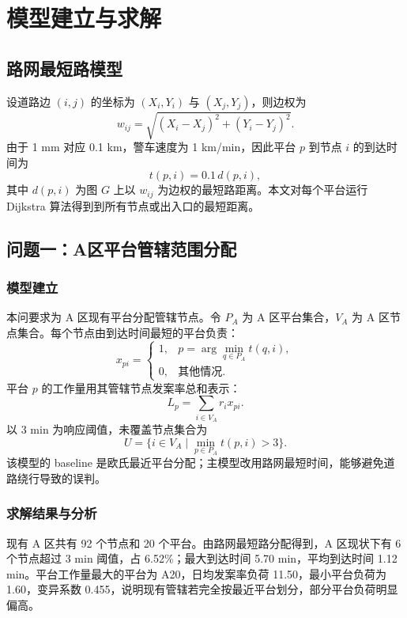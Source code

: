 \documentclass[UTF8,a4paper,12pt]{ctexart}
\begin{document}
\section{模型建立与求解}
\subsection{路网最短路模型}
设道路边 $(i,j)$ 的坐标为 $(X_i,Y_i)$ 与 $(X_j,Y_j)$，则边权为
\begin{equation}
w_{ij}=\sqrt{(X_i-X_j)^2+(Y_i-Y_j)^2} .
\end{equation}
由于 1 mm 对应 0.1 km，警车速度为 1 km/min，因此平台 $p$ 到节点 $i$ 的到达时间为
\begin{equation}
t(p,i)=0.1\,d(p,i),
\end{equation}
其中 $d(p,i)$ 为图 $G$ 上以 $w_{ij}$ 为边权的最短路距离。本文对每个平台运行 Dijkstra 算法得到到所有节点或出入口的最短距离。

\subsection{问题一：A区平台管辖范围分配}
\subsubsection{模型建立}
本问要求为 A 区现有平台分配管辖节点。令 $P_A$ 为 A 区平台集合，$V_A$ 为 A 区节点集合。每个节点由到达时间最短的平台负责：
\begin{equation}
x_{pi}=\begin{cases}
1, & p=\arg\min_{q\in P_A} t(q,i),\\
0, & \text{其他情况}.
\end{cases}
\end{equation}
平台 $p$ 的工作量用其管辖节点发案率总和表示：
\begin{equation}
L_p=\sum_{i\in V_A} r_i x_{pi}.
\end{equation}
以 3 min 为响应阈值，未覆盖节点集合为
\begin{equation}
U=\{i\in V_A\mid \min_{p\in P_A}t(p,i)>3\}.
\end{equation}
该模型的 baseline 是欧氏最近平台分配；主模型改用路网最短时间，能够避免道路绕行导致的误判。

\subsubsection{求解结果与分析}
现有 A 区共有 92 个节点和 20 个平台。由路网最短路分配得到，A 区现状下有 6 个节点超过 3 min 阈值，占 6.52\%；最大到达时间 5.70 min，平均到达时间 1.12 min。平台工作量最大的平台为 A20，日均发案率负荷 11.50，最小平台负荷为 1.60，变异系数 0.455，说明现有管辖若完全按最近平台划分，部分平台负荷明显偏高。
\end{document}
